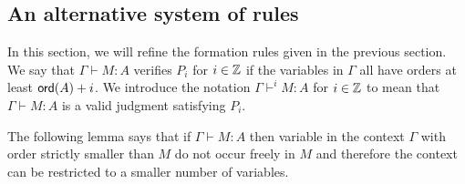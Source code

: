 \subsection{An alternative system of rules}


In this section, we will refine the formation rules
given in the previous section. We say that $\Gamma \vdash M : A$ verifies $P_i$ for $i \in \mathbb{Z}$ if the
variables in $\Gamma$ all have orders at least ${\sf ord}(A)+i$. We introduce the notation $\Gamma \vdash^{i} M : A$ for $i \in
\mathbb{Z}$ to mean that $\Gamma \vdash M : A$ is a valid judgment satisfying $P_i$.


The following lemma says that if $\Gamma \vdash M : A$ then variable in the context $\Gamma$ with order
strictly smaller than $M$ do not occur freely in $M$ and therefore the context can be restricted to a smaller number of variables.

